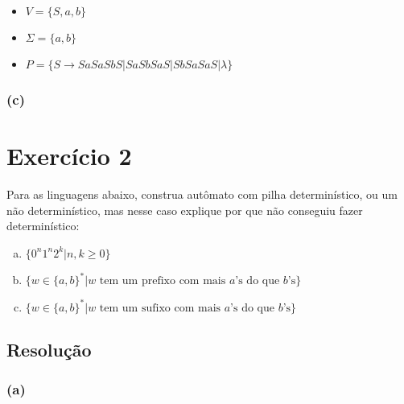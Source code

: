 \documentclass{article}
\begin{document}
\begin{itemize}
	\item $V = \{S, a, b\}$
	\item $\Sigma = \{a, b\}$
	\item $P=\{S\rightarrow SaSaSbS | SaSbSaS | SbSaSaS | \lambda\}$
\end{itemize}


\subsubsection{(c)}


\section{Exercício 2}

Para as linguagens abaixo, construa autômato com pilha determinístico, ou um não determinístico, mas nesse caso explique por que não conseguiu fazer determinístico:

\begin{enumerate}[(a)]
	\item $\{0^n1^n2^k|n,k\geq 0\}$
	\item $\{w\in\{a,b\}^*|w\text{ tem um prefixo com mais }a\text{'s do que }b\text{'s}\}$
	\item $\{w\in\{a,b\}^*|w\text{ tem um sufixo com mais }a\text{'s do que }b\text{'s}\}$
\end{enumerate}

\subsection{Resolução}

\subsubsection{(a)}

\begin{center}
\end{center}
\end{document}
